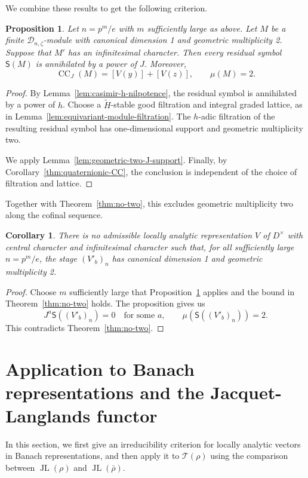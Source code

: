 \documentclass[11pt]{article}
\newtheorem{proposition}[theorem]{Proposition}
\newtheorem{corollary}[theorem]{Corollary}
\theoremstyle{definition}
\newcommand{\JL}{\operatorname{JL}}
\newcommand{\Tau}{\mathcal T}
\newcommand{\CC}{\operatorname{CC}}
\begin{document}
We combine these results to get the following criterion.

\begin{proposition}\label{prop:infinitesimal-geometric-two}
Let $n=p^m/e$ with $m$ sufficiently large as above.
Let $M$ be a finite $\mathscr D_{n,\zeta}$-module %
with canonical dimension 1 and geometric
multiplicity 2. Suppose that
$M'$ has an infinitesimal character. Then every residual symbol $\mathsf S(M)$ is
annihilated by a power of $J$. Moreover,
\[
 \CC_J(M)=[V(y)]+[V(z)],
 \qquad\mu(M)=2.
\]
\end{proposition}
\begin{proof}
By Lemma~\ref{lem:casimir-h-nilpotence}, the residual symbol is
annihilated by a power of $h$. Choose a $\widetilde H$-stable
good filtration and integral graded lattice, as in
Lemma~\ref{lem:equivariant-module-filtration}. The $h$-adic filtration of the resulting residual symbol
has one-dimensional support and geometric multiplicity two.

We apply Lemma~\ref{lem:geometric-two-J-support}. Finally,
by Corollary~\ref{thm:quaternionic-CC}, the conclusion is independent of the
choice of filtration and lattice.
\end{proof}

Together with Theorem~\ref{thm:no-two}, this excludes geometric
multiplicity two along the cofinal sequence.

\begin{corollary}\label{cor:no-geometric-two}
There is no admissible locally analytic representation $V$ of
$D^\times$ with central character and infinitesimal character
such that, for all sufficiently large $n=p^m/e$,
the stage $(V'_b)_n$ has canonical dimension 1 and geometric
multiplicity 2.
\end{corollary}
\begin{proof}
Choose $m$ sufficiently large that
Proposition~\ref{prop:infinitesimal-geometric-two} applies and
the bound in Theorem~\ref{thm:no-two} holds. The proposition gives us
\[
 J^a\mathsf S((V'_b)_n)=0\quad\text{for some }a,
 \qquad \mu(\mathsf S((V'_b)_n))=2.
\]
This contradicts Theorem~\ref{thm:no-two}.
\end{proof}


\section{Application to Banach representations and the Jacquet-Langlands functor}
\label{sec:application}
In this section, we first give an irreducibility criterion for locally analytic
vectors in Banach representations, and then apply it to
$\Tau(\rho)$ using the comparison between $\JL(\rho)$ and
$\JL(\bar\rho)$.
\end{document}
